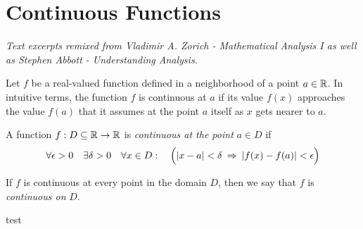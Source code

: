 \section{Continuous Functions}

\textit{Text excerpts remixed from Vladimir A. Zorich - Mathematical Analysis I as well as Stephen Abbott - Understanding Analysis.}

Let $f$ be a real-valued function defined in a neighborhood of a point $a \in \R$. In intuitive terms, the function $f$ is continuous at $a$ if its value $f(x)$ approaches the value $f(a)$ that it assumes at the point $a$ itself as $x$ gets nearer to $a$.

\begin{definition}
    A function $f: D\subseteq \R \to \R$ is \textit{continuous at the point} $a \in D$ if
    \begin{align}
        \forall \epsilon > 0 \quad \exists \delta > 0
        \quad \forall x \in D: \quad
        \Bigl(|x - a| < \delta \: \implies \: |f(x) - f(a)| < \epsilon \Bigr)
    \end{align}

    If $f$ is continuous at every point in the domain $D$, then we say that $f$ is \textit{continuous on} $D$.
\end{definition}

\begin{definition}[Fibration]
    test
\end{definition}